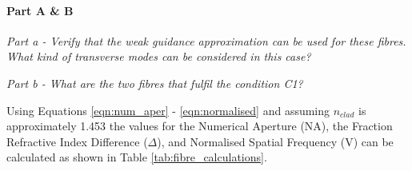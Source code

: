 \documentclass[colorlinks,11pt,a4paper,normalphoto,withhyper,ragged2e]{altareport}
\begin{document}
\medskip




\paragraph{Part A \& B \linebreak}
\textit{Part a - Verify that the weak guidance approximation can be used for these fibres. What kind of transverse modes can be considered in this case?} \linebreak

\textit{Part b - What are the two fibres that fulfil the condition C1?} \linebreak


Using Equations \ref{eqn:num_aper} - \ref{eqn:normalised} and assuming $n_{clad}$ is approximately 1.453 the values for the Numerical Aperture (NA), the Fraction Refractive Index Difference ($\Delta$), and Normalised Spatial Frequency (V) can be calculated as shown in Table \ref{tab:fibre_calculations}.
\end{document}
